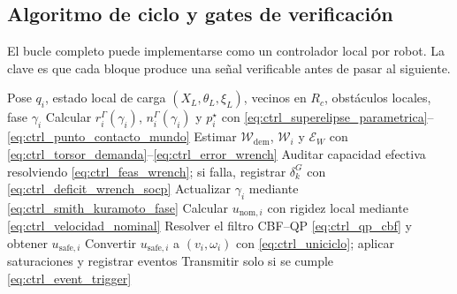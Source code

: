 \subsection{Algoritmo de ciclo y gates de verificación}
\label{subsec:control-algoritmo-gates}

El bucle completo puede implementarse como un controlador local por robot. La clave es
que cada bloque produce una señal verificable antes de pasar al siguiente.

\begin{algorithm}[htbp]
\caption{Control vectorial local por ciclo para el robot $i$}
\label{alg:control-vectorial}
\begin{algorithmic}[1]
\Require Pose $q_i$, estado local de carga $(X_L,\theta_L,\xi_L)$, vecinos en $R_c$,
obstáculos locales, fase $\gamma_i$
\State Calcular $r_i^\Gamma(\gamma_i)$, $n_i^\Gamma(\gamma_i)$ y $p_i^\star$ con
\eqref{eq:ctrl_superelipse_parametrica}--\eqref{eq:ctrl_punto_contacto_mundo}
\State Estimar $\mathcal W_{\mathrm{dem}}$, $\mathcal W_i$ y $\mathcal E_W$ con
\eqref{eq:ctrl_torsor_demanda}--\eqref{eq:ctrl_error_wrench}
\State Auditar capacidad efectiva resolviendo \eqref{eq:ctrl_feas_wrench}; si falla,
registrar $\delta_k^G$ con \eqref{eq:ctrl_deficit_wrench_socp}
\State Actualizar $\gamma_i$ mediante \eqref{eq:ctrl_smith_kuramoto_fase}
\State Calcular $u_{\mathrm{nom},i}$ con rigidez local mediante
\eqref{eq:ctrl_velocidad_nominal}
\State Resolver el filtro CBF--QP \eqref{eq:ctrl_qp_cbf} y obtener
$u_{\mathrm{safe},i}$
\State Convertir $u_{\mathrm{safe},i}$ a $(v_i,\omega_i)$ con
\eqref{eq:ctrl_uniciclo}; aplicar saturaciones y registrar eventos
\State Transmitir solo si se cumple \eqref{eq:ctrl_event_trigger}
\end{algorithmic}
\end{algorithm}

